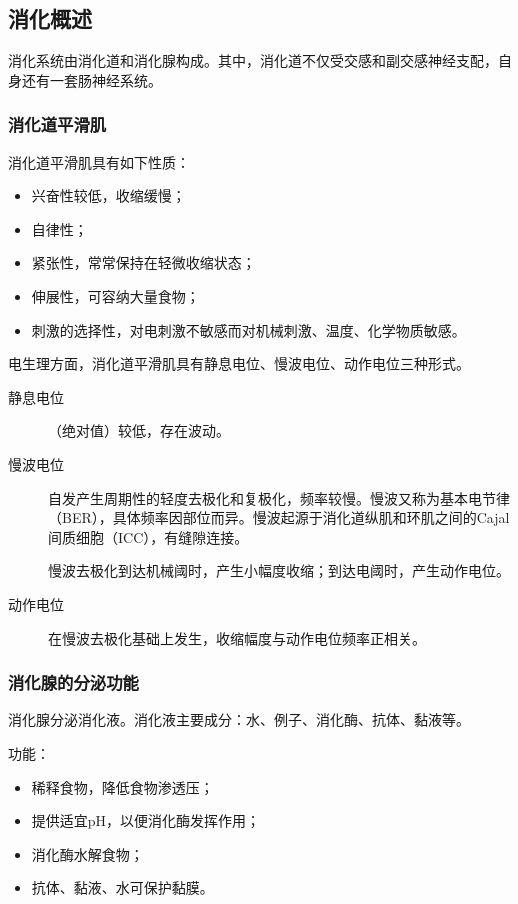 \subsection{消化概述}

消化系统由消化道和消化腺构成。其中，消化道不仅受交感和副交感神经支配，自身还有一套肠神经系统。

\subsubsection{消化道平滑肌}

消化道平滑肌具有如下性质：

\begin{itemize}
	\item 兴奋性较低，收缩缓慢；\item 自律性；\item 紧张性，常常保持在轻微收缩状态；\item 伸展性，可容纳大量食物；\item 刺激的选择性，对电刺激不敏感而对机械刺激、温度、化学物质敏感。
\end{itemize}

电生理方面，消化道平滑肌具有静息电位、慢波电位、动作电位三种形式。

\begin{description}
	\item[静息电位] （绝对值）较低，存在波动。
	\item[慢波电位] 自发产生周期性的轻度去极化和复极化，频率较慢。慢波又称为基本电节律（BER），具体频率因部位而异。慢波起源于消化道纵肌和环肌之间的Cajal间质细胞（ICC），有缝隙连接。
	
	慢波去极化到达机械阈时，产生小幅度收缩；到达电阈时，产生动作电位。
	\item[动作电位] 在慢波去极化基础上发生，收缩幅度与动作电位频率正相关。
\end{description}

\subsubsection{消化腺的分泌功能}

消化腺分泌消化液。消化液主要成分：水、例子、消化酶、抗体、黏液等。

功能：

\begin{itemize}
	\item 稀释食物，降低食物渗透压；
	\item 提供适宜pH，以便消化酶发挥作用；
	\item 消化酶水解食物；
	\item 抗体、黏液、水可保护黏膜。
\end{itemize}


